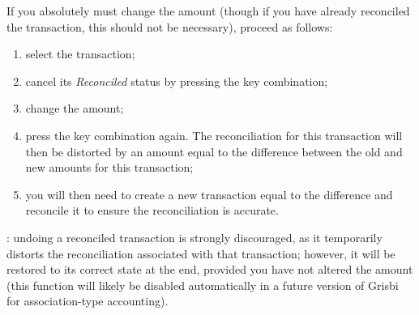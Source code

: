 If you absolutely must change the amount (though if you have already reconciled the transaction, this should not be necessary), proceed as follows:
\begin{enumerate}
	\item select the transaction;
	\item cancel its \emph{Reconciled} status by pressing the  key combination;
	\item change the amount;
	\item press the  key combination again. The reconciliation for this transaction will then be distorted by an amount equal to the difference between the old and new amounts for this transaction;
	\item you will then need to create a new transaction equal to the difference and reconcile it to ensure the reconciliation is accurate.
\end{enumerate}

\Attention{}: undoing a reconciled transaction is strongly discouraged, as it temporarily distorts the reconciliation associated with that transaction; however, it will be restored to its correct state at the end, provided you have not altered the amount (this function will likely be disabled automatically in a future version of Grisbi for association-type accounting).


